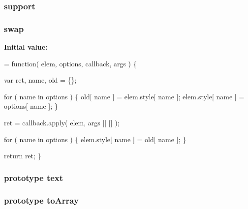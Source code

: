 \hypertarget{jquery-1_810_82-vsdoc_8js_a1be69652377630fc5432ae5ec6463744}{
\subsubsection[{support}]{ support}}\label{jquery-1_810_82-vsdoc_8js_a1be69652377630fc5432ae5ec6463744}
\hypertarget{jquery-1_810_82-vsdoc_8js_a5e5b5f48f4ead1c526f9a8aede2780ef}{
\subsubsection[{swap}]{ swap}}\label{jquery-1_810_82-vsdoc_8js_a5e5b5f48f4ead1c526f9a8aede2780ef}
{\bfseries Initial value\-:}
\begin{DoxyCode}
= \textcolor{keyword}{function}( elem, options, callback, args ) \{

        var ret, name,
            old = \{\};

        
        \textcolor{keywordflow}{for} ( name in options ) \{
            old[ name ] = elem.style[ name ];
            elem.style[ name ] = options[ name ];
        \}

        ret = callback.apply( elem, args || [] );

        
        \textcolor{keywordflow}{for} ( name in options ) \{
            elem.style[ name ] = old[ name ];
        \}

        \textcolor{keywordflow}{return} ret;
    \}
\end{DoxyCode}
\hypertarget{jquery-1_810_82-vsdoc_8js_aa5b77da29631a344064bb3d20c8702de}{
\subsubsection[{text}]{ {\bf prototype} text}}\label{jquery-1_810_82-vsdoc_8js_aa5b77da29631a344064bb3d20c8702de}
\hypertarget{jquery-1_810_82-vsdoc_8js_a6a1f7257e5962f80de1ab2941bc232c4}{
\subsubsection[{to\-Array}]{ {\bf prototype} to\-Array}}\label{jquery-1_810_82-vsdoc_8js_a6a1f7257e5962f80de1ab2941bc232c4}
